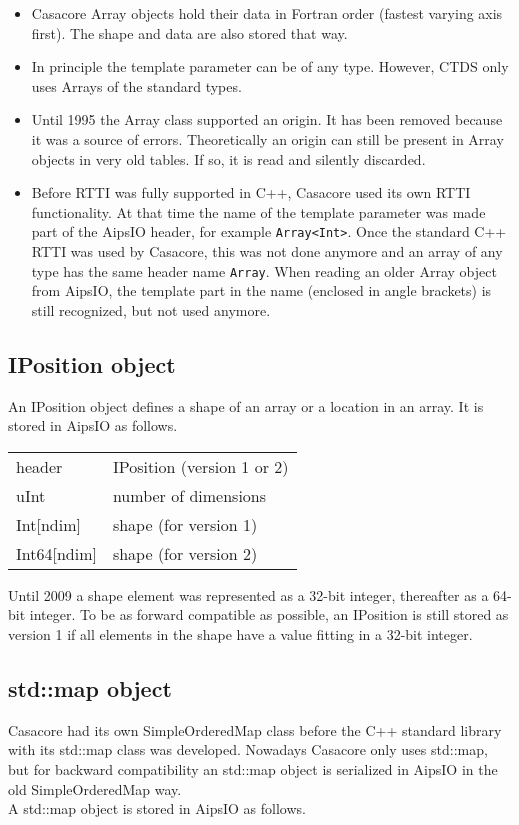 \begin {itemize}
\item Casacore Array objects hold their data in Fortran order (fastest
  varying axis first). The shape and data are also stored that way.
\item In principle the template parameter can be of any
  type. However, CTDS only uses Arrays of the standard types.
\item Until 1995 the Array class supported an origin. It has been
  removed because it was a
  source of errors. Theoretically an origin can still be present in
  Array objects in very old tables. If so, it is read and silently discarded.
\item Before RTTI was fully supported in C++, Casacore used its
  own RTTI functionality. At that time the name of the template
  parameter was made part of the AipsIO header, for example
  \texttt{Array<Int>}. Once the standard C++ RTTI was used by Casacore, this was
  not done anymore and an array of any type has the same header name
  \texttt{Array}. When reading an older Array object from AipsIO, the
  template part in the name (enclosed in angle brackets) is still
  recognized, but not used anymore. 
\end {itemize}


\subsection{IPosition object}
An IPosition object defines a shape of an array or a location in an array.
It is stored in AipsIO as follows.

\vspace{0.15in}
\begin{tabular}{|l|p{13cm}|} \hline
  header & IPosition (version 1 or 2) \\
  uInt & number of dimensions \\
  Int[ndim] & shape (for version 1) \\
  Int64[ndim] & shape (for version 2) \\
  \hline
\end{tabular}
\vspace{0.15in}

Until 2009 a shape element was represented as a 32-bit integer,
thereafter as a 64-bit integer. To be as forward compatible as
possible, an IPosition is still stored as version 1 if all elements in
the shape have a value fitting in a 32-bit integer.


\subsection{\label{CTDS:MAP}std::map object}
Casacore had its own SimpleOrderedMap class before the C++ standard
library with its std::map class was developed. Nowadays Casacore only
uses std::map, but for backward compatibility an std::map object is
serialized in AipsIO in the old SimpleOrderedMap way.
\\A std::map object is stored in AipsIO as follows.

